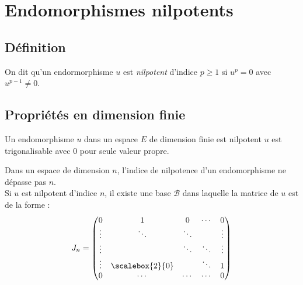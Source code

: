 \documentclass[11pt,a4paper,fleqn,pdftex]{report}
\begin{document}
\section{Endomorphismes nilpotents} %
\label{sec:endomorphismes_nilpotents}
\subsection{Définition}
\begin{dfn}
     On dit qu'un endormorphisme $u$ est \emph{nilpotent} d'indice $p\ge 1$ si $u^p = 0$ avec $u^{p-1} \neq 0$.
\end{dfn}
\subsection{Propriétés en dimension finie} %
\label{sub:proprietes_en_dimension_finie}
\begin{theorem}
     Un endomorphisme $u$ dans un espace $E$ de dimension finie est nilpotent \ssi $u$ est trigonalisable avec $0$ pour seule valeur propre.
\end{theorem}
\begin{theorem}
     Dans un espace de dimension $n$, l'indice de nilpotence d'un endomorphisme ne dépasse pas $n$. \\
     Si $u$ est nilpotent d'indice $n$, il existe une base $\mathcal{B}$ dans laquelle la matrice de $u$ est de la forme :
     \begin{equation}
     J_n=
     \begin{pmatrix}
             0   &         1       &    0   & \cdots &    0   \\
          \vdots &      \ddots     & \ddots &        & \vdots \\
          \vdots &                 & \ddots & \ddots & \vdots \\
          \vdots & \scalebox{2}{0} &        & \ddots &    1   \\
             0   &      \cdots     & \cdots & \cdots &    0  
     \end{pmatrix}
     \end{equation}
\end{theorem}
\end{document}
